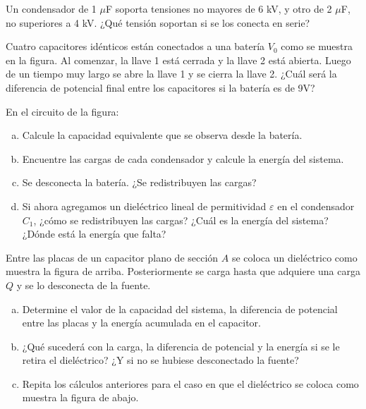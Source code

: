 \documentclass[problemas]{guia}
\begin{document}
\begin{problema}{} 
    Un condensador de 1 $\mu$F soporta tensiones no mayores de 6 kV, y otro 
    de 2 $\mu$F, no superiores a 4 kV. ¿Qué tensión soportan si se los 
    conecta en serie?
\end{problema}

\begin{problema}{}
    Cuatro capacitores idénticos están conectados a una batería $V_0$ como se 
    muestra en la figura. Al comenzar, la llave 1 está cerrada y la llave 2 
    está abierta. Luego de un tiempo muy largo se abre la llave 1 y se cierra 
    la llave 2. ¿Cuál será la diferencia de potencial final entre los 
    capacitores si la batería es de 9V?
\end{problema}

\begin{problema}{}
    En el circuito de la figura:
    \begin{enumerate}[(a)]
        \item Calcule la capacidad equivalente que se observa desde la batería.
        \item Encuentre  las  cargas  de  cada  condensador  y  calcule  la 
            energía del sistema.
        \item Se desconecta la batería. ¿Se redistribuyen las cargas?
        \item Si ahora agregamos un dieléctrico lineal de permitividad 
            $\varepsilon$ en el condensador $C_1$, ¿cómo se redistribuyen las 
            cargas? ¿Cuál es la energía del sistema? ¿Dónde está la energía 
            que falta?
    \end{enumerate}
\end{problema}

\begin{problema}{}
    Entre las placas de un capacitor plano de sección $A$ se coloca un 
    dieléctrico como muestra la figura de arriba. Posteriormente se carga 
    hasta que adquiere una carga $Q$ y se lo desconecta de la fuente.
    \begin{enumerate}[(a)]
        \item Determine el valor de la capacidad del sistema, la diferencia de
            potencial entre las placas y la energía acumulada en el capacitor.
        \item ¿Qué sucederá con la carga, la diferencia de potencial y la 
            energía si se le retira el dieléctrico? ¿Y si no se hubiese 
            desconectado la fuente?
        \item Repita los cálculos anteriores para el caso en que el dieléctrico
            se coloca como muestra la figura de abajo.
    \end{enumerate}
\end{problema}
\end{document}
